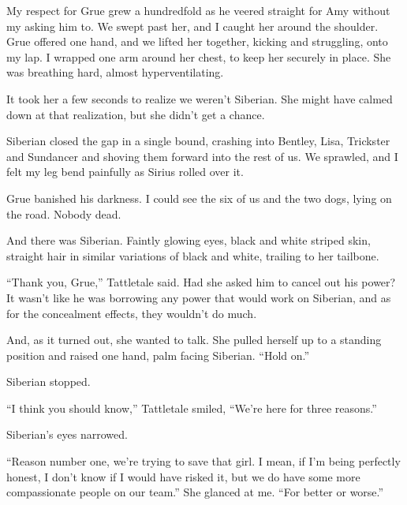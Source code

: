 My respect for Grue grew a hundredfold as he veered straight for Amy without my asking him to.  We swept past her, and I caught her around the shoulder.  Grue offered one hand, and we lifted her together, kicking and struggling, onto my lap.  I wrapped one arm around her chest, to keep her securely in place.  She was breathing hard, almost hyperventilating.



It took her a few seconds to realize we weren't Siberian.  She might have calmed down at that realization, but she didn't get a chance.



Siberian closed the gap in a single bound, crashing into Bentley, Lisa, Trickster and Sundancer and shoving them forward into the rest of us.  We sprawled, and I felt my leg bend painfully as Sirius rolled over it.



Grue banished his darkness.  I could see the six of us and the two dogs, lying on the road. Nobody dead.



And there was Siberian.  Faintly glowing eyes, black and white striped skin, straight hair in similar variations of black and white, trailing to her tailbone.



``Thank you, Grue,'' Tattletale said.  Had she asked him to cancel out his power?  It wasn't like he was borrowing any power that would work on Siberian, and as for the concealment effects, they wouldn't do much.



And, as it turned out, she wanted to talk.  She pulled herself up to a standing position and raised one hand, palm facing Siberian.  ``Hold on.''



Siberian stopped.



``I think you should know,'' Tattletale smiled, ``We're here for three reasons.''



Siberian's eyes narrowed.



``Reason number one, we're trying to save that girl.  I mean, if I'm being perfectly honest, I don't know if I would have risked it, but we do have some more compassionate people on our team.''  She glanced at me.  ``For better or worse.''



